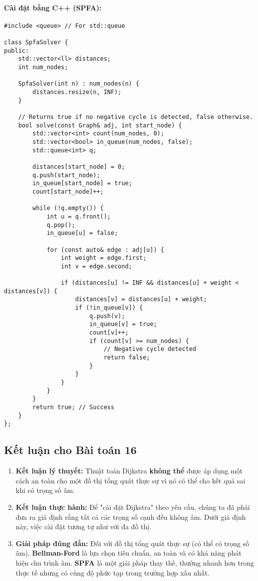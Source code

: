 \documentclass[a4paper,12pt]{article}
\begin{document}
\paragraph{Cài đặt bằng C++ (SPFA):}
\begin{lstlisting}[style=cppstyle, caption={Cài đặt SPFA trong C++.}, label={lst:cpp_spfa}]
#include <queue> // For std::queue

class SpfaSolver {
public:
    std::vector<ll> distances;
    int num_nodes;

    SpfaSolver(int n) : num_nodes(n) {
        distances.resize(n, INF);
    }

    // Returns true if no negative cycle is detected, false otherwise.
    bool solve(const Graph& adj, int start_node) {
        std::vector<int> count(num_nodes, 0);
        std::vector<bool> in_queue(num_nodes, false);
        std::queue<int> q;

        distances[start_node] = 0;
        q.push(start_node);
        in_queue[start_node] = true;
        count[start_node]++;

        while (!q.empty()) {
            int u = q.front();
            q.pop();
            in_queue[u] = false;

            for (const auto& edge : adj[u]) {
                int weight = edge.first;
                int v = edge.second;
                
                if (distances[u] != INF && distances[u] + weight < distances[v]) {
                    distances[v] = distances[u] + weight;
                    if (!in_queue[v]) {
                        q.push(v);
                        in_queue[v] = true;
                        count[v]++;
                        if (count[v] >= num_nodes) {
                            // Negative cycle detected
                            return false; 
                        }
                    }
                }
            }
        }
        return true; // Success
    }
};
\end{lstlisting}

\subsection{Kết luận cho Bài toán 16}
\begin{enumerate}
    \item \textbf{Kết luận lý thuyết:} Thuật toán Dijkstra \textbf{không thể} được áp dụng một cách an toàn cho một đồ thị tổng quát thực sự vì nó có thể cho kết quả sai khi có trọng số âm.
    \item \textbf{Kết luận thực hành:} Để "cài đặt Dijkstra" theo yêu cầu, chúng ta đã phải đưa ra giả định rằng tất cả các trọng số cạnh đều không âm. Dưới giả định này, việc cài đặt tương tự như với đa đồ thị.
    \item \textbf{Giải pháp đúng đắn:} Đối với đồ thị tổng quát thực sự (có thể có trọng số âm), \textbf{Bellman-Ford} là lựa chọn tiêu chuẩn, an toàn và có khả năng phát hiện chu trình âm. \textbf{SPFA} là một giải pháp thay thế, thường nhanh hơn trong thực tế nhưng có cùng độ phức tạp trong trường hợp xấu nhất.
\end{enumerate}
\end{document}
